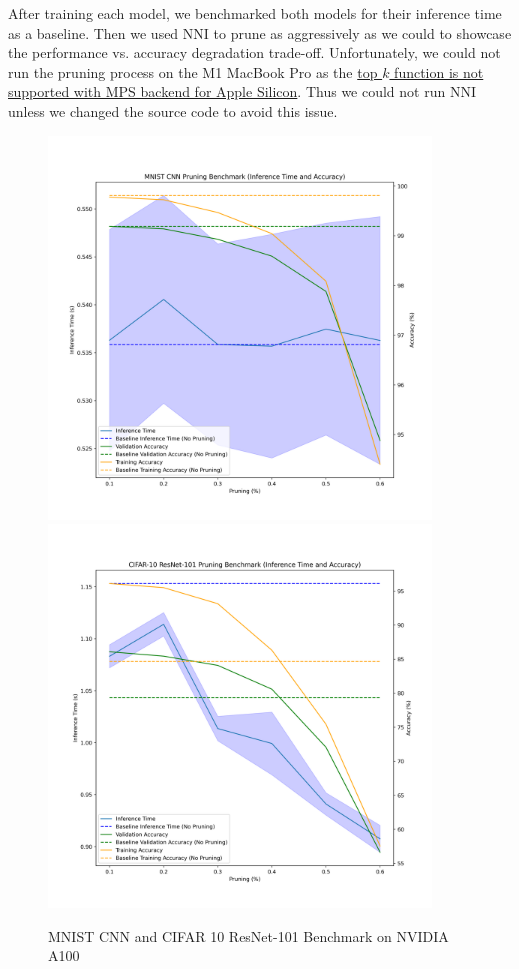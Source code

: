 \documentclass{article}
\begin{document}
After training each model, we benchmarked both models for their inference time as a baseline. Then we used NNI to prune as aggressively as we could to showcase the performance vs. accuracy degradation trade-off. Unfortunately, we could not run the pruning process on the M1 MacBook Pro as the \href{https://github.com/pytorch/pytorch/issues/78915}{top $k$ function is not supported with MPS backend for Apple Silicon}. Thus we could not run NNI unless we changed the source code to avoid this issue.

\begin{figure}
	\centerline{
		\includegraphics[width=4in]{../proj1/figures/mnist_cnn_benchmark.png}
		\includegraphics[width=4in]{../proj1/figures/resnet101_benchmark.png}
	}
	\caption{MNIST CNN and CIFAR 10 ResNet-101 Benchmark on NVIDIA A100}
	\label{fig:a100benchmark}
\end{figure}
\end{document}
